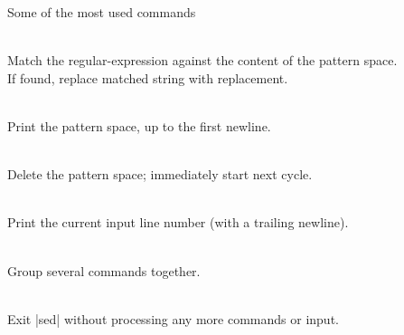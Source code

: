 \begin{frame}{Some of the most used commands}
    \vspace{-2mm}
    \begin{description}[XXX]
        \item[{s/regexp/replacement/[flags]}] ~\\[0.5ex]
            Match the regular-expression against the content of the pattern space.\\
            If found, replace matched string with replacement.
        \item[p] ~\\[0.5ex]
            Print the pattern space, up to the first newline.
        \item[d] ~\\[0.5ex]
            Delete the pattern space; immediately start next cycle.
        \item[=] ~\\[0.5ex]
            Print the current input line number (with a trailing newline).
        \item[\{ cmd ; cmd \ldots \}] ~\\[0.5ex]
            Group several commands together.
        \item[q] ~\\[0.5ex]
            Exit \bash|sed| without processing any more commands or input.
    \end{description}
\end{frame}
